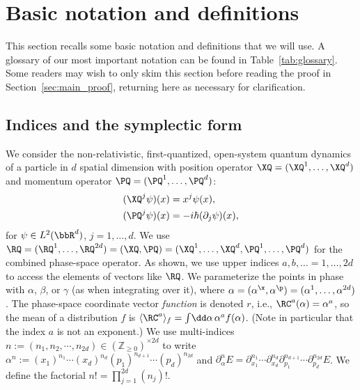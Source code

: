 \documentclass{article}
\numberwithin{equation}{section}
\begin{document}
	
	
\section{Basic notation and definitions}\label{sec:notation}

This section recalls some basic notation and definitions that we will use. A glossary of our most important notation can be found in Table~\ref{tab:glossary}.
Some readers may wish to only skim this section before reading the proof in Section~\ref{sec:main_proof}, returning here as necessary for clarification.


	
\subsection{Indices and the symplectic form}\label{sec:symplectic-basics}

We consider the non-relativistic, first-quantized,  open-system quantum dynamics of a particle in $d$ spatial dimension with position operator $\XQ = (\XQ^1,\ldots,\XQ^d)$ and momentum operator $\PQ = (\PQ^1,\ldots,\PQ^d)$:
\begin{align}
    \label{eq:x-op-def}
    (\XQ^j\psi)(x) &= x^j \psi(x),\\
    \label{eq:p-op-def}
    (\PQ^j\psi)(x) &= -i\hbar (\partial_j \psi)(x),
\end{align}
for $\psi\in L^2(\bbR^d)$, $j=1,\ldots,d$.
We use $\RQ = (\RQ^1,\ldots,\RQ^{2d}) = (\XQ,\PQ) = (\XQ^1,\ldots,\XQ^d,\PQ^1,\ldots,\PQ^d)$ for the combined phase-space operator.   As shown, we use upper indices $a, b, \ldots =1,\ldots, 2d$ to access the elements of vectors like $\RQ$.  We parameterize the points in phase with $\alpha$, $\beta$, or $\gamma$ (as when integrating over it), where $\alpha = (\alpha^\x,\alpha^\p) = (\alpha^1,\ldots,\alpha^{2d})$.  The phase-space coordinate vector \emph{function} is denoted $r$, i.e., $\RC^a(\alpha) = \alpha^a$, so the mean of a distribution $f$ is $\langle \RC^a \rangle_f = \int\!\dd\alpha\, \alpha^a f(\alpha)$. (Note in particular that the index $a$ is not an exponent.) We use multi-indices $n:=(n_1,n_2,\cdots,n_{2d}) \in (\mathbb{Z}_{\ge 0})^{\times 2d}$ to write $\alpha^n := (x_1)^{n_1}\cdots (x_d)^{n_d} (p_1)^{n_{d+1}}\cdots (p_d)^{n_{2d}}$ and $\partial_\alpha^n E=\partial_{x_1}^{n_1}\cdots\partial_{x_d}^{n_d} \partial_{p_1}^{n_{d+1}}\cdots\partial_{p_d}^{n_{2d}}E$. We define the factorial $n!=\prod_{j=1}^{2d} (n_j)!$.
\end{document}
